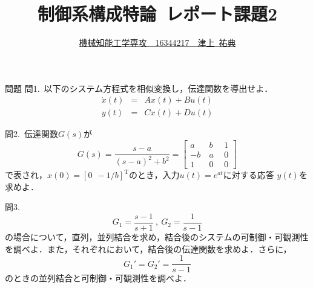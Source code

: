 \documentclass[a4paper,12pt]{jarticle}
\begin{document}
%
\title{\vspace{-30mm} 制御系構成特論~レポート課題2}
\author{\underline{機械知能工学専攻~~16344217~~津上~祐典}}
\date{}
%
\maketitle
%
\vspace{-25mm}
%

\begin{itembox}[l]{\Large{問題}}
問1.~以下のシステム方程式を相似変換し，伝達関数を導出せよ．
  \begin{eqnarray}
   \dot{x}(t)&=&Ax(t)+Bu(t) \\
   y(t)&=&Cx(t)+Du(t)
  \end{eqnarray}

問2.~伝達関数$G(s)$が
\begin{equation}
 G(s)=\frac{s-a}{(s-a)^2+b^2}
  =\left[
  \begin{array}{rc|r}
  a   &~ b ~&~ 1 \\
   -b &~ a ~&~ 0 \\ \hline
   1  &~ 0 ~&~ 0
  \end{array}
  \right]
\end{equation}
で表され，$x(0)=[0~~-1/b]^{\mathrm{T}}$のとき，入力$u(t)=e^{at}$に対する応答
$y(t)$を求めよ．
 
問3.
 \begin{equation}
 G_1=\frac{s-1}{s+1}~,~G_2=\frac{1}{s-1}
 \end{equation}
 の場合について，直列，並列結合を求め，結合後のシステムの可制御・可観測性
 を調べよ．また，それぞれにおいて，結合後の伝達関数を求めよ．さらに，
 \begin{equation}
  G_1'=G_2'=\frac{1}{s-1}  
 \end{equation}
 のときの並列結合と可制御・可観測性を調べよ．
\end{itembox}

\vspace{-10mm}
\end{document}
